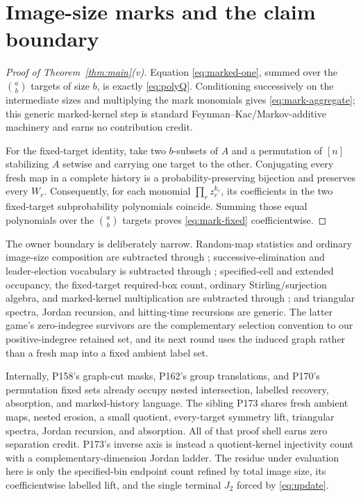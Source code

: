 \documentclass[a4paper,10pt]{amsart}
\theoremstyle{remark}
\begin{document}
\section{Image-size marks and the claim boundary}

\begin{proof}[Proof of Theorem~\ref{thm:main}(v)]
Equation \eqref{eq:marked-one}, summed over the $\binom ab$ targets of size
$b$, is exactly \eqref{eq:polyQ}.  Conditioning successively on the
intermediate sizes and multiplying the mark monomials gives
\eqref{eq:mark-aggregate}; this generic marked-kernel step is standard
Feynman--Kac/Markov-additive machinery \cite{FitzsimmonsPitman1999} and earns
no contribution credit.

For the fixed-target identity, take two $b$-subsets of $A$ and a permutation
of $[n]$ stabilizing $A$ setwise and carrying one target to the other.
Conjugating every fresh map in a complete history is a probability-preserving
bijection and preserves every $W_r$.  Consequently, for each monomial
$\prod_r z_r^{k_r}$, its coefficients in the two fixed-target
subprobability polynomials coincide.  Summing those equal polynomials over
the $\binom ab$ targets proves \eqref{eq:mark-fixed} coefficientwise.
\end{proof}

The owner boundary is deliberately narrow.  Random-map statistics and
ordinary image-size composition are subtracted through
\cite{FlajoletOdlyzko1990,ZubkovSerov2017}; successive-elimination and
leader-election vocabulary is subtracted through
\cite{HoffmanJenkinsRoughgarden2002}; specified-cell and extended occupancy,
the fixed-target required-box count, ordinary Stirling/surjection algebra,
and marked-kernel multiplication are subtracted through
\cite{Charalambides1984,ONeill2023,FitzsimmonsPitman1999}; and triangular
spectra, Jordan recursion, and hitting-time recursions are generic.  The
latter game's zero-indegree survivors are the
complementary selection convention to our positive-indegree retained set,
and its next round uses the induced graph rather than a fresh map into a
fixed ambient label set.

Internally, P158's graph-cut masks, P162's group translations, and P170's
permutation fixed sets already occupy nested intersection, labelled recovery,
absorption, and marked-history language.  The sibling P173 shares fresh
ambient maps, nested erosion, a small quotient, every-target symmetry lift,
triangular spectra, Jordan recursion, and absorption.  All of that proof
shell earns zero separation credit.  P173's inverse axis is instead a
quotient-kernel injectivity count with a complementary-dimension Jordan
ladder.  The residue under evaluation here is only the specified-bin
endpoint count refined by total image size, its coefficientwise labelled
lift, and the single terminal $J_2$ forced by \eqref{eq:update}.
\end{document}
